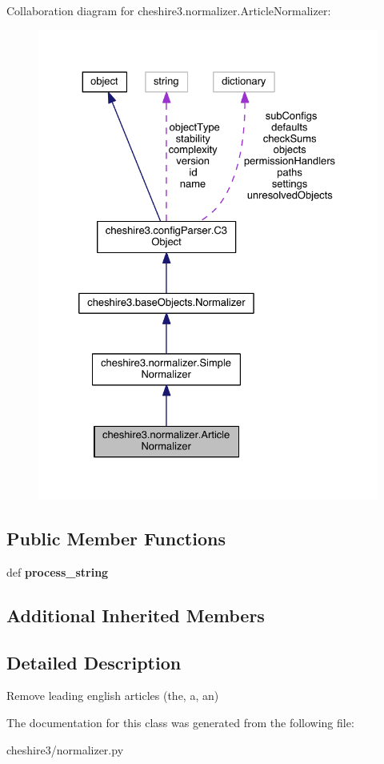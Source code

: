 Collaboration diagram for cheshire3.\-normalizer.\-Article\-Normalizer\-:
\nopagebreak
\begin{figure}[H]
\begin{center}
\leavevmode
\includegraphics[width=328pt]{classcheshire3_1_1normalizer_1_1_article_normalizer__coll__graph}
\end{center}
\end{figure}
\subsection*{Public Member Functions}
\begin{DoxyCompactItemize}
\item 
\hypertarget{classcheshire3_1_1normalizer_1_1_article_normalizer_ad29b9a4377f5dc28b21b893e77f01424}{def {\bfseries process\-\_\-string}}\label{classcheshire3_1_1normalizer_1_1_article_normalizer_ad29b9a4377f5dc28b21b893e77f01424}

\end{DoxyCompactItemize}
\subsection*{Additional Inherited Members}


\subsection{Detailed Description}
\begin{DoxyVerb}Remove leading english articles (the, a, an)\end{DoxyVerb}
 

The documentation for this class was generated from the following file\-:\begin{DoxyCompactItemize}
\item 
cheshire3/normalizer.\-py\end{DoxyCompactItemize}
